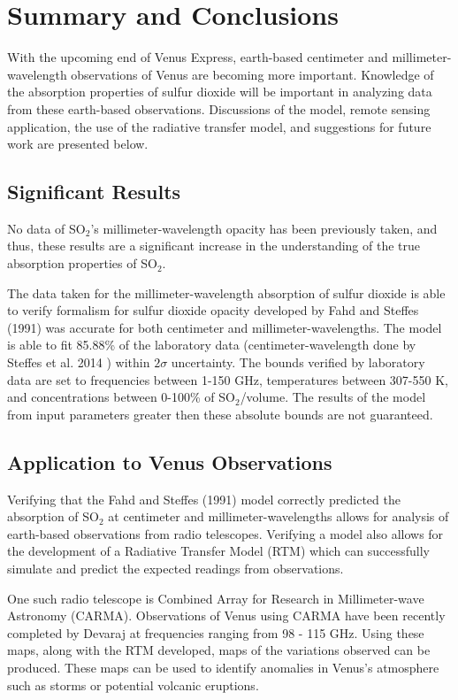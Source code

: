 \chapter{Summary and Conclusions}
With the upcoming end of Venus Express, earth-based centimeter and millimeter-wavelength observations of Venus are becoming more important. Knowledge of the absorption properties of sulfur dioxide will be important in analyzing data from these earth-based observations. Discussions of the model, remote sensing application, the use of the radiative transfer model, and suggestions for future work are presented below.
\section{Significant Results}
No data of SO$_2$'s millimeter-wavelength opacity has been previously taken, and thus, these results are a significant increase in the understanding of the true absorption properties of SO$_2$.

The data taken for the millimeter-wavelength absorption of sulfur dioxide is able to verify formalism for sulfur dioxide opacity developed by Fahd and Steffes (1991) \cite{Fahd-1991} was accurate for both centimeter and millimeter-wavelengths. The model is able to fit 85.88\% of the laboratory data (centimeter-wavelength done by Steffes et al. 2014 \cite{Steffes-2014}) within $2\sigma$ uncertainty. The bounds verified by laboratory data are set to frequencies between 1-150 GHz, temperatures between 307-550 K, and concentrations between 0-100\% of SO$_2$/volume. The results of the model from input parameters greater then these absolute bounds are not guaranteed.
\section{Application to Venus Observations}
Verifying that the Fahd and Steffes (1991) \cite{Fahd-1991} model correctly predicted the absorption of SO$_2$ at centimeter and millimeter-wavelengths allows for analysis of earth-based observations from radio telescopes. Verifying a model also allows for the development of a Radiative Transfer Model (RTM) which can successfully simulate and predict the expected readings from observations. 

One such radio telescope is Combined Array for Research in Millimeter-wave Astronomy (CARMA). Observations of Venus using CARMA have been recently completed by Devaraj \cite{Devaraj-CARMA} at frequencies ranging from 98 - 115 GHz. Using these maps, along with the RTM developed, maps of the variations observed can be produced. These maps can be used to identify anomalies in Venus's atmosphere such as storms or potential volcanic eruptions.

